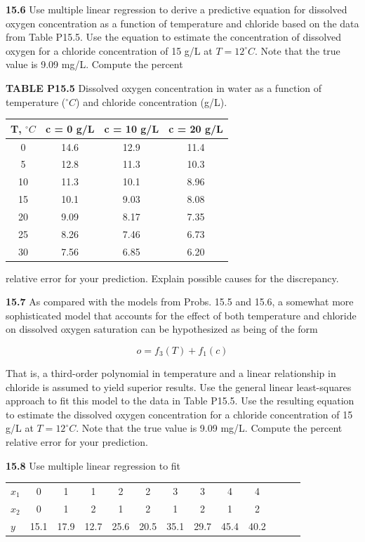 \documentclass[../main.tex]{subfiles}
\begin{document}
\begin{multicols}{2}
	\noindent\textbf{15.6} Use multiple linear regression to derive a predictive
	equation for dissolved oxygen concentration as a function of
	temperature and chloride based on the data from Table P15.5.
	Use the equation to estimate the concentration of dissolved
	oxygen for a chloride concentration of 15 g/L at $T = 12 ^\circ C$.
	Note that the true value is 9.09 mg/L. Compute the percent

	\noindent\textbf{TABLE P15.5} Dissolved oxygen concentration in water as a function of temperature ($^\circ C$) and chloride concentration (g/L).

	\noindent
	\begin{tabular}{c c c c}
		T, $^\circ C$ & c = 0 g/L & c = 10 g/L & c = 20 g/L \\
		\hline
		0 & 14.6 & 12.9 & 11.4 \\
		5 & 12.8 & 11.3 & 10.3 \\
		10 & 11.3 & 10.1 & 8.96 \\
		15 & 10.1 & 9.03 & 8.08 \\
		20 & 9.09 & 8.17 & 7.35 \\
		25 & 8.26 & 7.46 & 6.73 \\
		30 & 7.56 & 6.85 & 6.20
	\end{tabular}

	\noindent relative error for your prediction. Explain possible causes for
	the discrepancy.

	\noindent\textbf{15.7} As compared with the models from Probs. 15.5 and
	15.6, a somewhat more sophisticated model that accounts
	for the effect of both temperature and chloride on dissolved oxygen saturation can be hypothesized as being of
	the form

	$$
		o = f_3 (T ) + f_1(c)
	$$

	\noindent That is, a third-order polynomial in temperature and a linear
	relationship in chloride is assumed to yield superior results.
	Use the general linear least-squares approach to fit this
	model to the data in Table P15.5. Use the resulting equation
	to estimate the dissolved oxygen concentration for a chloride
	concentration of 15 g/L at $T = 12^\circ C$. Note that the true
	value is 9.09 mg/L. Compute the percent relative error for
	your prediction.

	\noindent\textbf{15.8} Use multiple linear regression to fit

	\noindent
	\begin{tabular}{l c c c c c c c c c c c c}
		\textbf{$x_1$} & 0 & 1 & 1 & 2 & 2 & 3 & 3 & 4 & 4 \\
		\textbf{$x_2$} & 0 & 1 & 2 & 1 & 2 & 1 & 2 & 1 & 2 \\
		\textbf{$y$} & 15.1 & 17.9 & 12.7 & 25.6 & 20.5 & 35.1 & 29.7 & 45.4 & 40.2
	\end{tabular}


\end{multicols}
\end{document}
